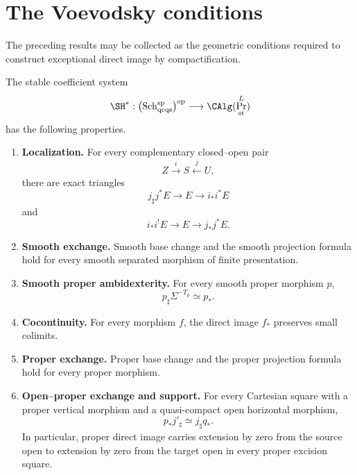 \section{The Voevodsky conditions}
\label{sec:voevodsky-conditions}

The preceding results may be collected as the geometric conditions required
to construct exceptional direct image by compactification.

\begin{theorem}
\label{thm:voevodsky-conditions}
The stable coefficient system
\[
    \SH^*:
    \bigl(
      \operatorname{Sch}^{\mathrm{sp}}_{\mathrm{qcqs}}
    \bigr)^{\mathrm{op}}
    \longrightarrow
    \CAlg(\Pr^L_{\mathrm{st}})
\]
has the following properties.
\begin{enumerate}
    \item \textbf{Localization.}
    For every complementary closed--open pair
    \[
        Z\xrightarrow{i}S\xleftarrow{j}U,
    \]
    there are exact triangles
    \[
        j_\sharp j^*E
        \longrightarrow
        E
        \longrightarrow
        i_*i^*E
    \]
    and
    \[
        i_*i^!E
        \longrightarrow
        E
        \longrightarrow
        j_*j^*E.
    \]

    \item \textbf{Smooth exchange.}
    Smooth base change and the smooth projection formula hold for every
    smooth separated morphism of finite presentation.

    \item \textbf{Smooth proper ambidexterity.}
    For every smooth proper morphism \(p\),
    \[
        p_\sharp\Sigma^{-T_p}
        \simeq
        p_*.
    \]

    \item \textbf{Cocontinuity.}
    For every morphism \(f\), the direct image \(f_*\) preserves small
    colimits.

    \item \textbf{Proper exchange.}
    Proper base change and the proper projection formula hold for every
    proper morphism.

    \item \textbf{Open--proper exchange and support.}
    For every Cartesian square with a proper vertical morphism and a
    quasi-compact open horizontal morphism,
    \[
        p_*j'_\sharp
        \simeq
        j_\sharp q_*.
    \]
    In particular, proper direct image carries extension by zero from the
    source open to extension by zero from the target open in every proper
    excision square.


\end{enumerate}
\end{theorem}

